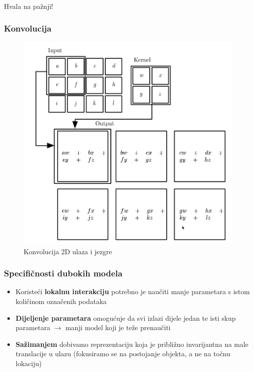 \documentclass{beamer}
\begin{document}

\begin{frame} 
\Huge{\centerline{Hvala na pažnji!}}
\end{frame}

\begin{frame}[noframenumbering]
	\frametitle{Konvolucija}
	\begin{figure}[h]
		\centering
		\includegraphics[scale=0.3]{convolution.png}
		\caption{Konvolucija 2D ulaza i jezgre}
	\end{figure}
\end{frame}

\begin{frame}[noframenumbering]
	\frametitle{Specifičnosti dubokih modela}
	\begin{itemize}
		\item Koristeći \textbf{lokalnu interakciju} potrebno je naučiti manje parametara s istom količinom označenih podataka
		\item \textbf{Dijeljenje parametara} omogućuje da svi izlazi dijele jedan te isti skup parametara $\rightarrow$ manji model koji je teže prenaučiti
		\item \textbf{Sažimanjem} dobivamo reprezentaciju koja je približno invarijantna na male translacije u ulazu (fokusiramo se na postojanje objekta, a ne na točnu lokaciju)
	\end{itemize}
\end{frame}
\end{document}
